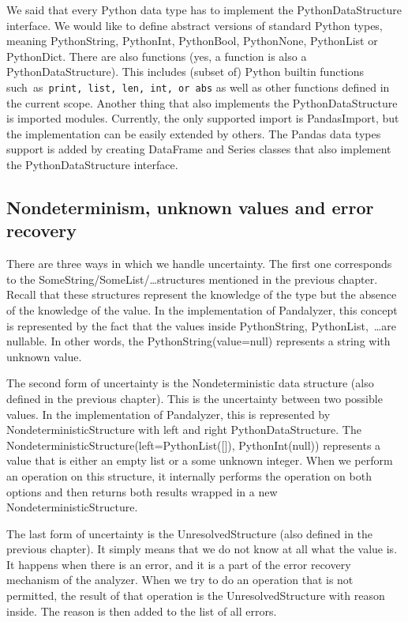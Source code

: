 We said that every Python data type has to implement the PythonDataStructure interface.
We would like to define abstract versions of standard Python types, meaning PythonString, PythonInt, PythonBool,
PythonNone, PythonList or PythonDict.
There are also functions (yes, a function is also a PythonDataStructure).
This includes (subset of) Python builtin functions \\such~as~\verb|print, list, len, int, or abs| as well as other
functions defined in the current scope.
Another thing that also implements the PythonDataStructure is imported modules.
Currently, the only supported import is PandasImport, but the implementation can be easily extended by others.
The Pandas data types support is added by creating DataFrame and Series classes that also implement the PythonDataStructure
interface.

\subsection{Nondeterminism, unknown values and error recovery}\label{subsec:nondeterminism}

There are three ways in which we handle uncertainty.
The first one corresponds to the SomeString/SomeList/\ldots structures mentioned in the previous chapter.
Recall that these structures represent the knowledge of the type but the absence of the knowledge of the value.
In the implementation of Pandalyzer, this concept is represented by the fact that the values inside PythonString,
PythonList,~\ldots are nullable.
In other words, the PythonString(value=null) represents a string with unknown value.

The second form of uncertainty is the Nondeterministic data structure (also defined in the previous chapter).
This is the uncertainty between two possible values.
In the implementation of Pandalyzer, this is represented by NondeterministicStructure with left and right
PythonDataStructure.
The NondeterministicStructure(left=PythonList([]), PythonInt(null)) represents a value that is either an empty list or a
some unknown integer.
When we perform an operation on this structure, it internally performs the operation on both options and then
returns both results wrapped in a new NondeterministicStructure.

The last form of uncertainty is the UnresolvedStructure (also defined in the previous chapter).
It simply means that we do not know at all what the value is.
It happens when there is an error, and it is a part of the error recovery mechanism of the analyzer.
When we try to do an operation that is not permitted, the result of that operation is the UnresolvedStructure with
reason inside.
The reason is then added to the list of all errors.

